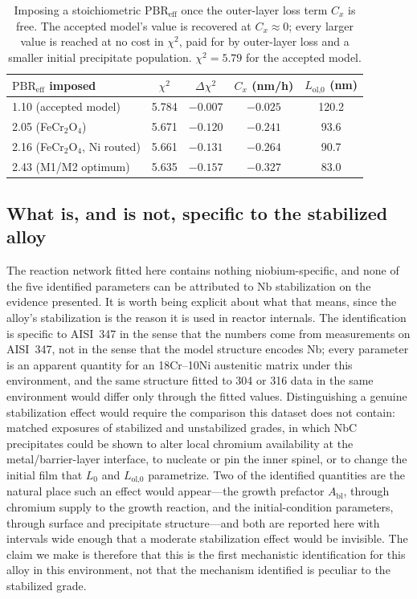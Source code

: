 \documentclass[preprint,12pt]{elsarticle}
\begin{document}
\begin{table}[htbp]
\centering
\caption{Imposing a stoichiometric $\mathrm{PBR}_\text{eff}$ once the
outer-layer loss term $C_x$ is free. The accepted model's value is
recovered at $C_x \approx 0$; every larger value is reached at no cost in
$\chi^2$, paid for by outer-layer loss and a smaller initial precipitate
population. $\chi^2 = 5.79$ for the accepted model.}
\label{tab:pbrclosure}
\small
\begin{tabular}{lcccc}
\toprule
$\mathrm{PBR}_\text{eff}$ imposed & $\chi^2$ & $\Delta\chi^2$ &
$C_x$ (nm/h) & $L_\text{ol,0}$ (nm) \\
\midrule
1.10 \; (accepted model)          & 5.784 & $-0.007$ & $-0.025$ & 120.2 \\
2.05 \; (FeCr$_2$O$_4$)           & 5.671 & $-0.120$ & $-0.241$ & 93.6 \\
2.16 \; (FeCr$_2$O$_4$, Ni routed) & 5.661 & $-0.131$ & $-0.264$ & 90.7 \\
2.43 \; (M1/M2 optimum)           & 5.635 & $-0.157$ & $-0.327$ & 83.0 \\
\bottomrule
\end{tabular}
\end{table}

\subsection{What is, and is not, specific to the stabilized alloy}

The reaction network fitted here contains nothing niobium-specific, and
none of the five identified parameters can be attributed to Nb
stabilization on the evidence presented. It is worth being explicit about
what that means, since the alloy's stabilization is the reason it is used
in reactor internals. The identification is specific to AISI~347 in the
sense that the numbers come from measurements on AISI~347, not in the
sense that the model structure encodes Nb; every parameter is an apparent
quantity for an 18Cr--10Ni austenitic matrix under this environment, and
the same structure fitted to 304 or 316 data in the same environment
would differ only through the fitted values. Distinguishing a genuine
stabilization effect would require the comparison this dataset does not
contain: matched exposures of stabilized and unstabilized grades, in
which NbC precipitates could be shown to alter local chromium
availability at the metal/barrier-layer interface, to nucleate or pin the
inner spinel, or to change the initial film that $L_0$ and
$L_\text{ol,0}$ parametrize. Two of the identified quantities are the
natural place such an effect would appear---the growth prefactor
$A_\text{bl}$, through chromium supply to the growth reaction, and the
initial-condition parameters, through surface and precipitate
structure---and both are reported here with intervals wide enough that a
moderate stabilization effect would be invisible. The claim we make is
therefore that this is the first mechanistic identification for this
alloy in this environment, not that the mechanism identified is peculiar
to the stabilized grade.
\end{document}
